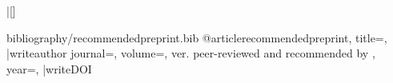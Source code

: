 \newcommand{\writeauthor}{author={\citeauthors},}
\newcommand{\writeDOI}{doi={\preprintDOI},}

\filecontentsspecials|[]
\begin{filecontents*}[overwrite]{bibliography/recommendedpreprint.bib}
@article{recommendedpreprint,
  title={\preprinttitle},
  |writeauthor%
  journal={\preprintserver},
  volume={\preprintnumber, ver. \preprintversion \space peer-reviewed and recommended by \emph{\PCI}},
  year={\pubyear},
  |writeDOI
}
\end{filecontents*}





\newcommand{\mybibexclude}[1]{\addtocategory{ignore}{#1}}
\usepackage{nameref}
\usepackage[pdfborder={0 0 0}]{hyperref}  %


\usepackage{graphbox}  %
\usepackage{floatrow}

\usepackage{microtype}
\setlength{\parindent}{0.4cm}
\linespread{1.2}
\RequirePackage[default,scale=0.90]{opensans}
\usepackage{xcolor}
\usepackage{changepage}
\usepackage[aboveskip=1pt,labelfont=bf,labelsep=period,singlelinecheck=off]{caption}


